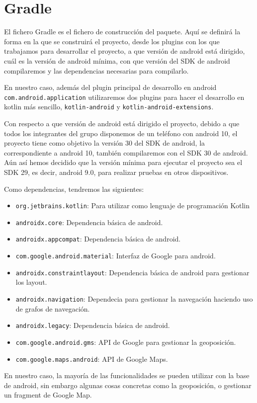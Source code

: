\section{Gradle}

El fichero Gradle es el fichero de construcción del paquete. Aquí se definirá la forma en la que se construirá el proyecto, desde los plugins con los que trabajamos para desarrollar el proyecto, a que versión de android está dirigido, cuál es la versión de android mínima, con que versión del SDK de android compilaremos y las dependencias necesarias para compilarlo.


En nuestro caso, además del plugin principal de desarrollo en android \texttt{com.android.application} utilizaremos dos plugins para hacer el desarrollo en kotlin más sencillo, \texttt{kotlin-android} y \texttt{kotlin-android-extensions}.

Con respecto a que versión de android está dirigido el proyecto, debido a que todos los integrantes del grupo disponemos de un teléfono con android 10, el proyecto tiene como objetivo la versión 30 del SDK de android, la correspondiente a android 10, también compilaremos con el SDK 30 de android. Aún así hemos decidido que la versión mínima para ejecutar el proyecto sea el SDK 29, es decir, android 9.0, para realizar pruebas en otros dispositivos.



Como dependencias, tendremos las siguientes:

\begin{itemize}
	\item \texttt{org.jetbrains.kotlin}: Para utilizar como lenguaje de programación Kotlin
	\item \texttt{androidx.core}: Dependencia básica de android.
	\item \texttt{androidx.appcompat}: Dependencia básica de android.
	\item \texttt{com.google.android.material}: Interfaz de Google para android.
	\item \texttt{androidx.constraintlayout}: Dependencia básica de android para gestionar los layout.
	\item \texttt{androidx.navigation}: Dependecia para gestionar la navegación haciendo uso de grafos de navegación.
	\item \texttt{androidx.legacy}: Dependencia básica de android.
	\item \texttt{com.google.android.gms}: API de Google para gestionar la geoposición.
	\item \texttt{com.google.maps.android}: API de Google Maps.
\end{itemize}


En nuestro caso, la mayoría de las funcionalidades se pueden utilizar con la base de android, sin embargo algunas cosas concretas como la geoposición, o gestionar un fragment de Google Map.


